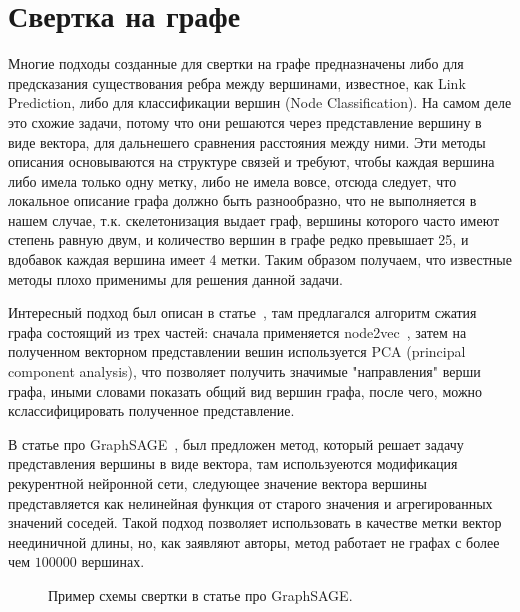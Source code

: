 \documentclass[12pt, twoside]{article}
\begin{document}
\section{Свертка на графе}
Многие подходы созданные для свертки на графе предназначены либо для предсказания существования ребра между вершинами, известное, как Link Prediction, либо для классификации вершин (Node Classification). На самом деле это схожие задачи, потому что они решаются через представление вершину в виде вектора, для дальнешего сравнения расстояния между ними. Эти методы описания основываются на структуре связей и требуют, чтобы каждая вершина либо имела только одну метку, либо не имела вовсе, отсюда следует, что локальное описание графа должно быть разнообразно, что не выполняется в нашем случае, т.к. скелетонизация выдает граф, вершины которого часто имеют степень равную двум, и количество вершин в графе редко превышает 25, и вдобавок каждая вершина имеет 4 метки. Таким образом получаем, что известные методы плохо применимы для решения данной задачи.

Интересный подход был описан в статье~\cite{embend_like_cnn_on_photo}, там предлагался алгоритм сжатия графа состоящий из трех частей: сначала применяется node2vec~\cite{node2vec}, затем на полученном векторном представлении вешин используется PCA (principal component analysis), что позволяет получить значимые "направления" верши графа, иными словами показать общий вид вершин графа, после чего, можно кслассифицировать полученное представление.

В статье про GraphSAGE~\cite{GraphSAGE}, был предложен метод, который решает задачу представления вершины в виде вектора, там используеются модификация рекурентной нейронной сети, следующее значение вектора вершины представляется как нелинейная функция от старого значения и агрегированных значений соседей. Такой подход позволяет использовать в качестве метки вектор неединичной длины, но, как заявляют авторы, метод работает не графах с более чем $100 000$ вершинах.

\begin{figure}[h]
\caption{Пример схемы свертки в статье про GraphSAGE.}
\label{GraphSage_scheme}
\end{figure}
\end{document}
